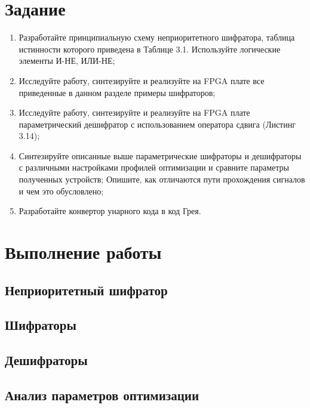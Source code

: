 \documentclass[a4paper,14pt]{article}
\begin{document}

\tableofcontents
\pagebreak
\section{Задание}

\begin{enumerate}
	\item Разработайте принципиальную схему неприоритетного шифратора, таблица истинности
	которого приведена в Таблице 3.1. Используйте логические элементы И-НЕ, ИЛИ-НЕ;
	
	\item Исследуйте работу, синтезируйте и реализуйте на FPGA плате все приведенные в данном
	разделе примеры шифраторов;
	
	\item Исследуйте работу, синтезируйте и реализуйте на FPGA плате параметрический дешифратор
	с использованием оператора сдвига (Листинг 3.14);
	
	\item Синтезируйте описанные выше параметрические шифраторы и дешифраторы с различными
	настройками профилей оптимизации и сравните параметры полученных устройств;
	Опишите, как отличаются пути прохождения сигналов и чем это обусловлено;
	
	\item Разработайте конвертор унарного кода в код Грея.
\end{enumerate}

\section{Выполнение работы}

\subsection{Неприоритетный шифратор}
 
 
\subsection{Шифраторы}

\subsection{Дешифраторы}

\subsection{Анализ параметров оптимизации}
\end{document}
